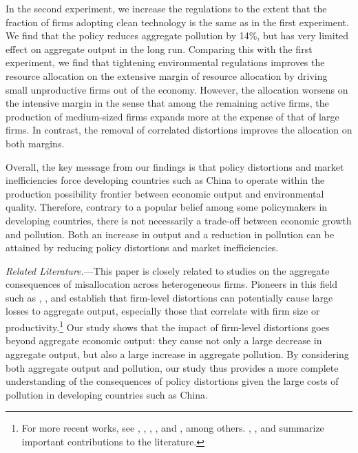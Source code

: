 \documentclass[AEJ]{AEA}
\begin{document}
In the second experiment, we increase the regulations to the extent that the fraction of firms adopting clean technology is the same as in the first experiment. We find that the policy reduces aggregate pollution by 14\%, but has very limited effect on aggregate output in the long run. Comparing this with the first experiment, we find that tightening environmental regulations improves the resource allocation on the extensive margin of resource allocation by driving small unproductive firms out of the economy. However, the allocation {worsens} on the intensive margin in the sense that among the remaining active firms, the production of medium-sized firms expands more at the expense of that of large firms. In contrast, the removal of correlated distortions improves the allocation on both margins.

Overall, the key message from our findings is that policy distortions and market inefficiencies force developing countries such as China to operate within the production possibility frontier between economic output and environmental quality. Therefore, contrary to a popular belief among some policymakers in developing countries, there is not necessarily a trade-off between economic growth and pollution. Both an increase in output and a reduction in pollution can be attained by reducing policy distortions and market inefficiencies.


\textit{Related Literature.}---This paper is closely related to studies on the aggregate consequences of misallocation across heterogeneous firms. Pioneers in this field such as \citet{Guneretal:2008}, \citet{RestucciaRogerson:2008}, and \citet{HsiehKlenow:2009} establish that firm-level distortions can potentially cause large losses to aggregate output, especially those that correlate with firm size or productivity.\footnote{For more recent works, see \citet{Bartelsmanetal:2013}, \citet{Bhattacharyaetal:2013}, \citet{HsiehKlenow:2014}, \citet{BentoRestuccia:2016}, and \citet{Guneretal:2017}, among others. \citet{RestucciaRogerson:2013}, \citet{Hopenhayn:2014b}, and \citet{RestucciaRogerson:2017} summarize important contributions to the literature.} Our study shows that the impact of firm-level distortions goes beyond aggregate economic output: they cause not only a large decrease in aggregate output, but also a large increase in aggregate pollution. By considering both aggregate output and pollution, our study thus provides a more complete understanding of the consequences of policy distortions given the large costs of pollution in developing countries such as China.
\end{document}
